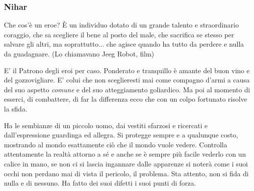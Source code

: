 \begin{multicols}{2}
\subsubsection{Nihar}\label{nihar}\hypertarget{nihar}{}

\begin{changemargin}{0.3cm}{0.3cm}\begin{enfasi}{
Che cos'è un eroe? È un individuo dotato di un grande talento e straordinario coraggio, che sa scegliere il bene al posto del male, che sacrifica se stesso per salvare gli altri, ma soprattutto... che agisce quando ha tutto da perdere e nulla da guadagnare. (Lo chiamavano Jeeg Robot, film)
}\end{enfasi}\end{changemargin}\medskip

E' il Patrono degli eroi per caso. Ponderato e tranquillo è amante del buon vino e del gozzovigliare. E' colui che non sceglieresti mai come compagno d'armi a causa del suo aspetto \emph{comune} e del suo atteggiamento goliardico. Ma poi al momento di esserci, di combattere, di far la differenza ecco che con un colpo fortunato risolve la sfida.

Ha le sembianze di un piccolo uomo, dai vestiti sfarzosi e ricercati e dall'espressione guardinga ed allegra. Si protegge sempre e a qualunque costo, mostrando al mondo esattamente ciò che il mondo vuole vedere. Controlla attentamente la realtà attorno a sé e anche se è sempre più facile vederlo con un calice in mano, se non ci si lascia ingannare dalle apparenze si noterà come i suoi occhi non perdano mai di vista il pericolo, il problema. Sta attento, non si fida di nulla e di nessuno. Ha fatto dei suoi difetti i suoi punti di forza.


\end{multicols}
